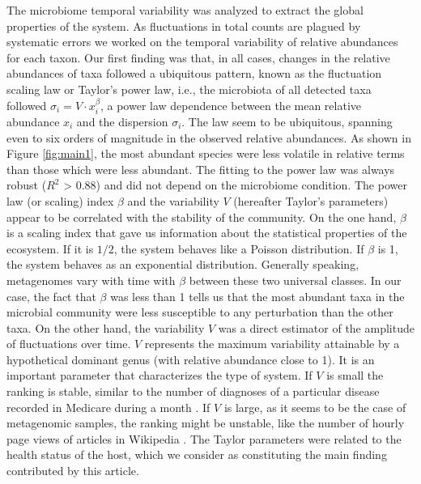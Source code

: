
The microbiome temporal variability was analyzed to extract the global properties of the system. As fluctuations in total counts are plagued by systematic errors we worked on the temporal variability of relative abundances for each taxon. Our first finding was that, in all cases, changes in the relative abundances of taxa followed a ubiquitous pattern, known as the fluctuation scaling law\cite{fs} or Taylor's power law\cite{taylor}, i.e., the microbiota of all detected taxa followed $\sigma_i  = V\cdot x_i^{\beta}$, a power law dependence between the mean relative abundance $x_i$ and the dispersion $\sigma_i$. The law seem to be ubiquitous, spanning even to six orders of magnitude in the observed relative abundances. As shown in Figure \ref{fig:main1}, the most abundant species were less volatile in relative terms than those which were less abundant. The fitting to the power law was always robust ($R^{2}$ > 0.88) and did not depend on the microbiome condition. The power law (or scaling) index $\beta$ and the variability $V$ (hereafter Taylor's parameters) appear to be correlated with the stability of the community. On the one hand, $\beta$ is a scaling index that gave us information about the statistical properties of the ecosystem. If it is $1/2$, the system behaves like a Poisson distribution. If $\beta$ is 1, the system behaves as an exponential distribution. Generally speaking, metagenomes vary with time with $\beta$ between these two universal classes. In our case, the fact that $\beta$ was less than 1 tells us that the most abundant taxa in the microbial community were less susceptible to any perturbation than the other taxa. On the other hand, the variability $V$ was a direct estimator of the amplitude of fluctuations over time. $V$ represents the maximum variability attainable by a hypothetical dominant genus (with relative abundance close to 1). It is an important parameter that characterizes the type of system. If $V$ is small the ranking is stable, similar to the number of diagnoses of a particular disease recorded in Medicare  during a month \cite{medicare}. If $V$ is large, as it seems to be the case of metagenomic samples, the ranking might be unstable, like the number of hourly page views of articles in Wikipedia \cite{ranking,fs}. The Taylor parameters were related to the health status of the host, which we consider as constituting the main finding contributed by this article.

